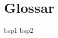 \chapter{Glossar}\label{ch:glossar}



\gls{bsp1}
\gls{bsp2}

\printnoidxglossary[type=type1]

\printnoidxglossary[type=type2]
